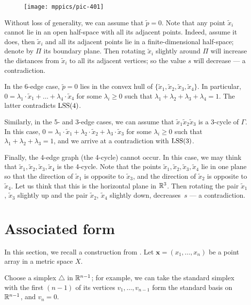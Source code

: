 \documentclass{article}
\begin{document}
\begin{figure}[ht!]
\centering
\texttt{[image: mppics/pic-401]}
\end{figure}

Without loss of generality, we can assume that $\tilde p=0$.
Note that any point $\tilde x_i$ cannot lie in an open half-space with all its
adjacent points.
Indeed, assume it does, then $\tilde x_i$ and all its adjacent points lie in a finite-dimensional half-space;
denote by $\Pi$ its boundary plane.
Then rotating $\tilde x_i$  slightly around $\Pi$ will increase the distances from $\tilde x_i$ to all its adjacent vertices;
so the value $s$ will decrease --- a contradiction.

In the 6-edge case, $\tilde p=0$ lies in the convex hull of $\{\tilde x_1,\tilde x_2,\tilde x_3,\tilde x_4\}$.
In particular, $0=\lambda_1\cdot \tilde x_1+\dots+\lambda_4\cdot\tilde x_4$ for some $\lambda_i\ge0$ such that $\lambda_1+\lambda_2+\lambda_3+\lambda_4=1$.
The latter contradicts $\mathrm{LSS}(4)$.

Similarly, in the 5- and 3-edge cases, we can assume that $\tilde x_1\tilde x_2\tilde x_3$ is a 3-cycle of $\Gamma$.
In this case, $0=\lambda_1\cdot \tilde x_1+\lambda_2\cdot\tilde x_2+\lambda_3\cdot\tilde x_3$ for some $\lambda_i\ge0$ such that $\lambda_1+\lambda_2+\lambda_3=1$, and we arrive at a contradiction with $\mathrm{LSS}(3)$.

Finally, the 4-edge graph (the 4-cycle) cannot occur.
In this case, we may think that $\tilde x_1,\tilde x_2,\tilde x_3,\tilde x_4$ is the 4-cycle.
Note that the points $\tilde x_1,\tilde x_2,\tilde x_3,\tilde x_4$  lie in one plane so that the direction of $\tilde x_1$ is opposite to $\tilde x_3$,
and the direction of $\tilde x_2$ is opposite to $\tilde x_4$.
Let us think that this is the horizontal plane in $\mathbb{R}^3$.
Then rotating the pair $\tilde x_1$, $\tilde x_3$ slightly up and 
the pair $\tilde x_2$, $\tilde x_4$  slightly down, decreases~$s$ --- a contradiction.
\qeds

\section{Associated form}

In this section, we recall a construction from \cite{petrunin-2017}.
Let $\bm{x}=(x_1,\dots,x_n)$ be a point array in a metric space $X$.

Choose a simplex $\triangle$ in $\mathbb{R}^{n-1}$; for example, we can take the standard simplex with the first $(n-1)$ of its vertices $v_1,\dots,v_{n-1}$ form the standard basis on $\mathbb{R}^{n-1}$, and $v_n=0$.
\end{document}
